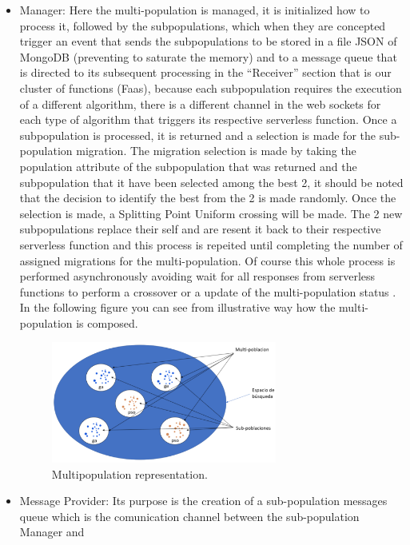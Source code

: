\documentclass[runningheads]{llncs}
\begin{document}
\begin{itemize}
  \item Manager: Here the multi-population is managed, it is initialized how to
  process it, followed by the subpopulations, which when they are concepted
  trigger an event that sends the subpopulations to be stored in a file JSON of
  MongoDB (preventing to saturate the memory) and to a message queue that is
  directed to its subsequent processing in the “Receiver” section that is our
  cluster of functions (Faas), because each subpopulation requires the execution
  of a different algorithm, there is a different channel in the web sockets for
  each type of algorithm that triggers its respective serverless function. Once
  a subpopulation is processed, it is returned and a selection is made for the
  sub-population migration. The migration selection is made by taking the
  population attribute of the subpopulation that was returned and the
  subpopulation that it have been selected among the best 2, it should be noted
  that the decision to identify the best from the 2 is made randomly. Once the
  selection is made, a Splitting Point Uniform crossing will be made. The 2 new
  subpopulations replace their self and are resent it back to their respective
  serverless function and this process is repeited until completing the number
  of assigned migrations for the multi-population. Of course this whole process
  is performed asynchronously avoiding wait for all responses from serverless
  functions to perform a crossover or a update of the multi-population status
  \cite{Lovbjerg2001,Jimeno2019}. In the following figure you can see from
  illustrative way how the multi-population is composed.
\begin{figure}[htp]
  \centering
  \includegraphics[width=0.7\textwidth]{img/multipopulation.png}
  \caption{Multipopulation representation.} \label{fig1}
  \end{figure}
\item Message Provider: Its purpose is the creation of a sub-population messages
queue which is the comunication channel between the sub-population Manager and

\end{itemize}
\end{document}
